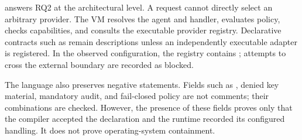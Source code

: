  answers RQ2 at the architectural level.  A request
cannot directly select an arbitrary provider.  The VM resolves the agent and
handler, evaluates policy, checks capabilities, and consults the executable
provider registry.  Declarative contracts such as  remain
descriptions unless an independently executable adapter is registered.  In the
observed configuration, the registry contains ; attempts to
cross the external boundary are recorded as blocked.

The language also preserves negative statements.  Fields such as
, denied key material, mandatory audit, and
fail-closed policy are not comments; their combinations are checked.  However,
the presence of these fields proves only that the compiler accepted the
declaration and the runtime recorded its configured handling.  It does not
prove operating-system containment.
